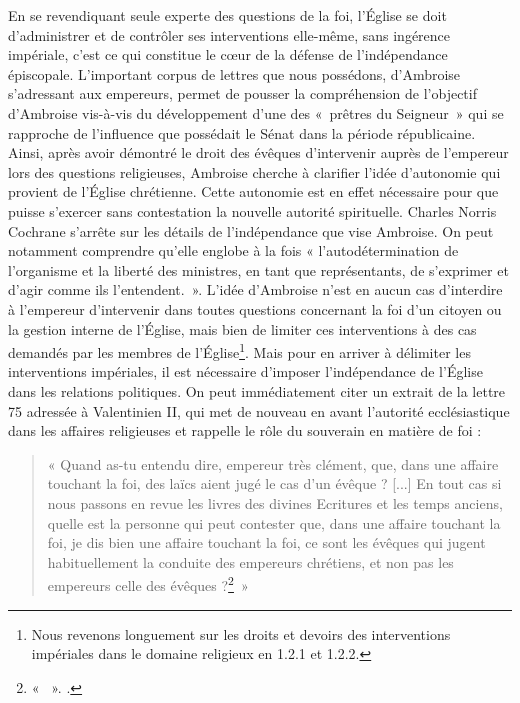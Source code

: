 En se revendiquant seule experte des questions de la foi, l’Église se doit d'administrer et de contrôler ses interventions elle-même, sans ingérence impériale, c’est ce qui constitue le cœur de la défense de l’indépendance épiscopale. L’important corpus de lettres que nous possédons, d’Ambroise s’adressant aux empereurs, permet de pousser la compréhension de l’objectif d’Ambroise vis-à-vis du développement d’une  des «~prêtres du Seigneur~» qui se rapproche de l’influence que possédait le Sénat dans la période républicaine. Ainsi, après avoir démontré le droit des évêques d’intervenir auprès de l’empereur lors des questions religieuses, Ambroise cherche à clarifier l’idée d’autonomie qui provient de l’Église chrétienne. Cette autonomie est en effet nécessaire pour que puisse s’exercer sans contestation la nouvelle autorité spirituelle. Charles Norris Cochrane s’arrête sur les détails de l’indépendance que vise Ambroise. On peut notamment comprendre qu’elle englobe à la fois « l'autodétermination de l’organisme et la liberté des ministres, en tant que représentants, de s’exprimer et d’agir comme ils l’entendent.\autocite[347]{cochrane_christianity}~». L’idée d’Ambroise n’est en aucun cas d’interdire à l’empereur d’intervenir dans toutes questions concernant la foi d’un citoyen ou la gestion interne de l’Église, mais bien de limiter ces interventions à des cas demandés par les membres de l’Église\footnote{Nous revenons longuement sur les droits et devoirs des interventions impériales dans le domaine religieux en 1.2.1 et 1.2.2.}. Mais pour en arriver à délimiter les interventions impériales, il est nécessaire d’imposer l’indépendance de l’Église dans les relations politiques. On peut immédiatement citer un extrait de la lettre 75 adressée à Valentinien II, qui met de nouveau en avant l’autorité ecclésiastique dans les affaires religieuses et rappelle le rôle du souverain en matière de foi :

\bigskip

\begin{quote}
    « Quand as-tu entendu dire, empereur très clément, que, dans une affaire touchant la foi, des laïcs aient jugé le cas d’un évêque ? [...] En tout cas si nous passons en revue les livres des divines Ecritures et les temps anciens, quelle est la personne qui peut contester que, dans une affaire touchant la foi, je dis bien une affaire touchant la foi, ce sont les évêques qui jugent habituellement la conduite des empereurs chrétiens, et non pas les empereurs celle des évêques ?\footnote{« ~». \cite[,4]{ambroise_lettres}.}~»
\end{quote}

